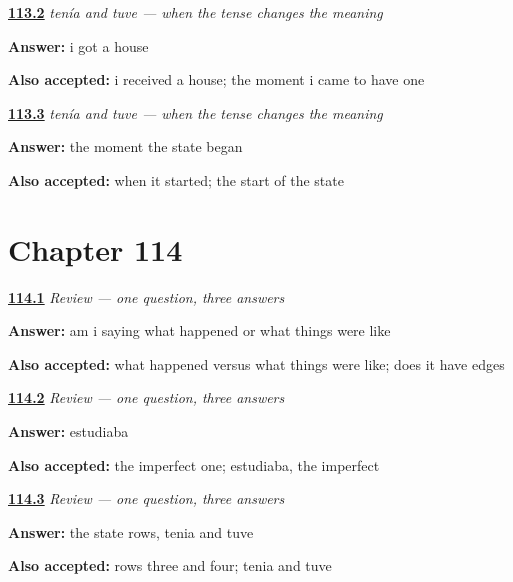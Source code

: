 \noindent\begin{minipage}[t]{\linewidth}
\raggedright
\hyperlink{review-ES-C48-tenia-tuve-got}{\textbf{113.2}} \emph{tenía and tuve — when the tense changes the meaning}\par
\small \textbf{Answer:} i got a house\par
\footnotesize \textbf{Also accepted:} i received a house; the moment i came to have one
\end{minipage}\par\medskip

\noindent\begin{minipage}[t]{\linewidth}
\raggedright
\hyperlink{review-ES-C48-tenia-tuve-rule}{\textbf{113.3}} \emph{tenía and tuve — when the tense changes the meaning}\par
\small \textbf{Answer:} the moment the state began\par
\footnotesize \textbf{Also accepted:} when it started; the start of the state
\end{minipage}\par\medskip

\section*{Chapter 114}

\noindent\begin{minipage}[t]{\linewidth}
\raggedright
\hyperlink{review-ES-C48-repaso-dos-pasados-question}{\textbf{114.1}} \emph{Review — one question, three answers}\par
\small \textbf{Answer:} am i saying what happened or what things were like\par
\footnotesize \textbf{Also accepted:} what happened versus what things were like; does it have edges
\end{minipage}\par\medskip

\noindent\begin{minipage}[t]{\linewidth}
\raggedright
\hyperlink{review-ES-C48-repaso-dos-pasados-scene}{\textbf{114.2}} \emph{Review — one question, three answers}\par
\small \textbf{Answer:} estudiaba\par
\footnotesize \textbf{Also accepted:} the imperfect one; estudiaba, the imperfect
\end{minipage}\par\medskip

\noindent\begin{minipage}[t]{\linewidth}
\raggedright
\hyperlink{review-ES-C48-repaso-dos-pasados-state}{\textbf{114.3}} \emph{Review — one question, three answers}\par
\small \textbf{Answer:} the state rows, tenia and tuve\par
\footnotesize \textbf{Also accepted:} rows three and four; tenia and tuve
\end{minipage}\par\medskip


